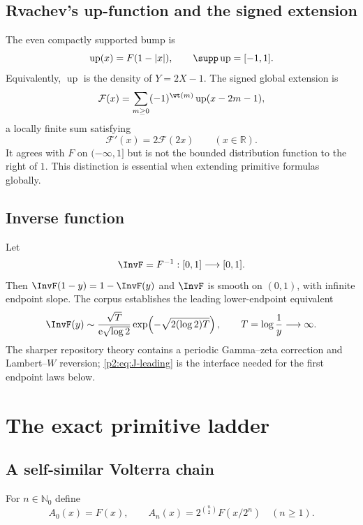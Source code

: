 \documentclass[11pt,oneside]{article}
\theoremstyle{definition}
\theoremstyle{remark}
\newcommand{\Up}{\operatorname{up}}
\newcommand{\R}{\mathbb R}
\newcommand{\N}{\mathbb N}
\newcommand{\e}{\mathrm e}
\newcommand{\1}{\mathbf 1}
\begin{document}
\subsection{Rvachev's up-function and the signed extension}
The even compactly supported bump is
\begin{equation}
 \Up(x)=F(1-|x|),\qquad \supp\Up=[-1,1].                   \label{p2:eq:up-def}
\end{equation}
Equivalently, $\Up$ is the density of $Y=2X-1$.  The signed global extension is
\begin{equation}
 \mathcal F(x)=\sum_{m\ge0}(-1)^{\wt(m)}\Up(x-2m-1),       \label{p2:eq:global-def}
\end{equation}
a locally finite sum satisfying
\begin{equation}
 \mathcal F'(x)=2\mathcal F(2x)\qquad(x\in\R).             \label{p2:eq:global-diffeq}
\end{equation}
It agrees with $F$ on $(-\infty,1]$ but is not the bounded distribution
function to the right of $1$.  This distinction is essential when extending
primitive formulas globally.

\subsection{Inverse function}
Let
\begin{equation}
 \InvF=F^{-1}:[0,1]\longrightarrow[0,1].                  \label{p2:eq:J-def}
\end{equation}
Then $\InvF(1-y)=1-\InvF(y)$ and $\InvF$ is smooth on $(0,1)$, with infinite
endpoint slope.  The corpus establishes the leading lower-endpoint equivalent
\begin{equation}
 \InvF(y)\sim
 \frac{\sqrt{T}}{\e\sqrt{\log2}}
 \exp\!\left(-\sqrt{2(\log2)T}\right),
 \qquad T=\log\frac1y\longrightarrow\infty.               \label{p2:eq:J-leading}
\end{equation}
The sharper repository theory contains a periodic Gamma--zeta correction and
Lambert--$W$ reversion; \eqref{p2:eq:J-leading} is the interface needed for the
first endpoint laws below.

\section{The exact primitive ladder}
\label{p2:sec:ladder}

\subsection{A self-similar Volterra chain}
For $n\in\N_0$ define
\begin{equation}
 A_0(x)=F(x),\qquad
 A_n(x)=2^{\binom n2}F(x/2^n)\quad(n\ge1).                 \label{p2:eq:An-def}
\end{equation}
\end{document}
